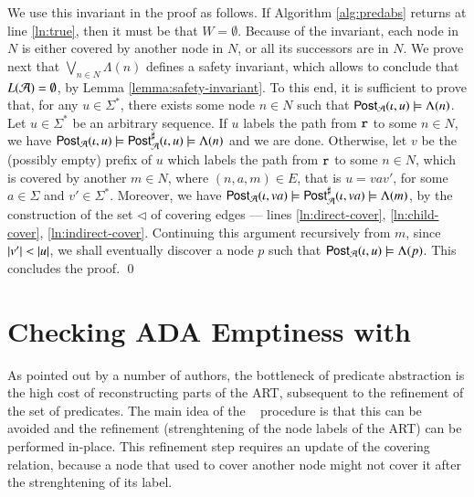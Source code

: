 \documentclass[10pt,conference,letterpaper,twocolumn]{IEEEtran}
\begin{document}
{  We use this invariant in the proof as follows. If Algorithm
  \ref{alg:predabs} returns at line \ref{ln:true}, then it must be
  that $W = \emptyset$. Because of the invariant, each node in $N$ is
  either covered by another node in $N$, or all its successors are in
  $N$. We prove next that $\bigvee_{n \in N} \Lambda(n)$ defines a
  safety invariant, which allows to conclude that $L(\mathcal{A}) = \emptyset$,
  by Lemma \ref{lemma:safety-invariant}. To this end, it is sufficient
  to prove that, for any $u \in \Sigma^*$, there exists some node $n
  \in N$ such that $\mathsf{Post}_{\mathcal{A}}(\iota,u) \models \Lambda(n)$. Let $u \in
  \Sigma^*$ be an arbitrary sequence. If $u$ labels the path from
  $\mathtt{r}$ to some $n \in N$, we have $\mathsf{Post}_{\mathcal{A}}(\iota,u) \models
  {\mathsf{Post}}^\sharp_{\mathcal{A}}(\iota,u) \models \Lambda(n)$ and we are
  done. Otherwise, let $v$ be the (possibly empty) prefix of $u$ which
  labels the path from $\mathtt{r}$ to some $n \in N$, which is covered
  by another $m \in N$, where $(n,a,m) \in E$, that is $u = vav'$, for
  some $a \in \Sigma$ and $v'\in\Sigma^*$. Moreover, we have
  $\mathsf{Post}_{\mathcal{A}}(\iota,va) \models {\mathsf{Post}}^\sharp_{\mathcal{A}}(\iota,va) \models
  \Lambda(m)$, by the construction of the set $\lhd$ of covering edges
  --- lines \ref{ln:direct-cover}, \ref{ln:child-cover},
  \ref{ln:indirect-cover}. Continuing this argument recursively from
  $m$, since ${|{v'}|} < {|{u}|}$, we shall eventually discover a node
  $p$ such that $\mathsf{Post}_{\mathcal{A}}(\iota,u) \models \Lambda(p)$. This
  concludes the proof. \qed}

\section{Checking ADA Emptiness with \impact}

As pointed out by a number of authors, the bottleneck of predicate
abstraction is the high cost of reconstructing parts of the ART,
subsequent to the refinement of the set of predicates. The main idea
of the \impact~ procedure \cite{mcmillan06} is that this can be
avoided and the refinement (strenghtening of the node labels of the
ART) can be performed in-place. This refinement step requires an
update of the covering relation, because a node that used to cover
another node might not cover it after the strenghtening of its label.
\end{document}
